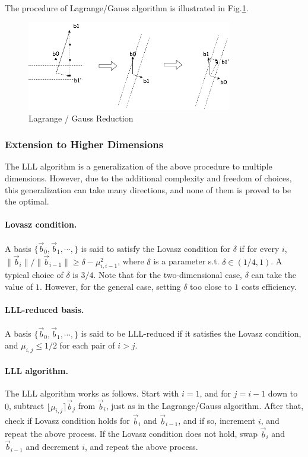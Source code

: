 \documentclass[11pt]{article}
\newcommand{\vb}{\vec{b}}
\begin{document}
The procedure of Lagrange/Gauss algorithm is illustrated in Fig.\ref{fig:bkz.lagrange}.

\begin{figure}[ht!]
\includegraphics[width=0.8\textwidth]{files/BKZ-Lagrange.png}
\caption{Lagrange / Gauss Reduction}
\label{fig:bkz.lagrange}
\end{figure}

\subsubsection{Extension to Higher Dimensions}

The LLL algorithm is a generalization of the above procedure to multiple dimensions. However, due to the additional complexity and freedom of choices, this generalization can take many directions, and none of them is proved to be the optimal.

\paragraph{Lovasz condition.} A basis $\{\vb_0,\vb_1,\cdots,\}$ is said to satisfy the Lovasz condition for $\delta$ if for every $i$, $\|\vb_i\|/\|\vb_{i-1}\|\geq\delta-\mu_{i,i-1}^2$, where $\delta$ is a parameter s.t. $\delta\in(1/4,1)$. A typical choice of $\delta$ is $3/4$. Note that for the two-dimensional case, $\delta$ can take the value of $1$. However, for the general case, setting $\delta$ too close to $1$ costs efficiency.

\paragraph{LLL-reduced basis.} A basis $\{\vb_0,\vb_1,\cdots,\}$ is said to be LLL-reduced if it satisfies the Lovasz condition, and $\mu_{i,j}\leq 1/2$ for each pair of $i>j$.

\paragraph{LLL algorithm.} The LLL algorithm works as follows. Start with $i=1$, and for $j=i-1$ down to $0$, subtract $\lfloor\mu_{i,j}\rceil\vb_j$ from $\vb_i$, just as in the Lagrange/Gauss algorithm. After that, check if Lovasz condition holds for $\vb_i$ and $\vb_{i-1}$, and if so, increment $i$, and repeat the above process. If the Lovasz condition does not hold, swap $\vb_i$ and $\vb_{i-1}$ and decrement $i$, and repeat the above process.
\end{document}

